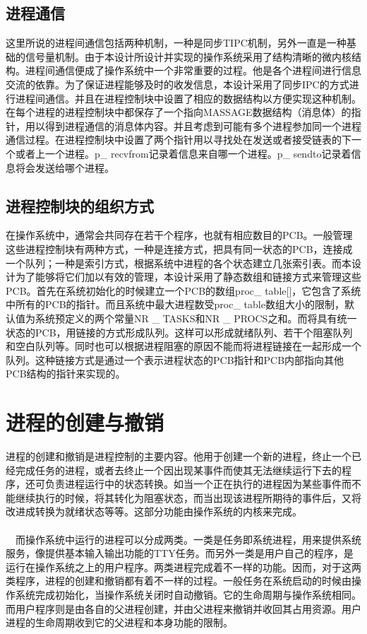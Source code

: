 \documentclass[UTF8,nofonts,cs4size]{ctexrep}
\begin{document}
\subsection{进程通信}
这里所说的进程间通信包括两种机制，一种是同步TIPC机制，另外一直是一种基础的信号量机制。由于本设计所设计并实现的操作系统采用了结构清晰的微内核结构。进程间通信便成了操作系统中一个非常重要的过程。他是各个进程间进行信息交流的依靠。为了保证进程能够及时的收发信息，本设计采用了同步IPC的方式进行进程间通信。并且在进程控制块中设置了相应的数据结构以方便实现这种机制。在每个进程的进程控制块中都保存了一个指向MASSAGE数据结构（消息体）的指针，用以得到进程通信的消息体内容。并且考虑到可能有多个进程参加同一个进程通信过程。在进程控制块中设置了两个指针用以寻找处在发送或者接受链表的下一个或者上一个进程。p\_ recvfrom记录着信息来自哪一个进程。p\_ sendto记录着信息将会发送给哪个进程。
\subsection{进程控制块的组织方式}
在操作系统中，通常会共同存在若干个程序，也就有相应数目的PCB。一般管理这些进程控制块有两种方式，一种是连接方式，把具有同一状态的PCB，连接成一个队列；一种是索引方式，根据系统中进程的各个状态建立几张索引表。而本设计为了能够将它们加以有效的管理，本设计采用了静态数组和链接方式来管理这些PCB。首先在系统初始化的时候建立一个PCB的数组proc\_ table[]，它包含了系统中所有的PCB的指针。而且系统中最大进程数受proc\_ table数组大小的限制，默认值为系统预定义的两个常量NR \_ TASKS和NR \_  PROCS之和。而将具有统一状态的PCB，用链接的方式形成队列。这样可以形成就绪队列、若干个阻塞队列和空白队列等。同时也可以根据进程阻塞的原因不能而将进程链接在一起形成一个队列。这种链接方式是通过一个表示进程状态的PCB指针和PCB内部指向其他PCB结构的指针来实现的。
\section{进程的创建与撤销}
进程的创建和撤销是进程控制的主要内容。他用于创建一个新的进程，终止一个已经完成任务的进程，或者去终止一个因出现某事件而使其无法继续运行下去的程序，还可负责进程运行中的状态转换。如当一个正在执行的进程因为某些事件而不能继续执行的时候，将其转化为阻塞状态，而当出现该进程所期待的事件后，又将改进成转换为就绪状态等等。这部分功能由操作系统的内核来完成。
\paragraph{}
\indent \ \ 而操作系统中运行的进程可以分成两类。一类是任务即系统进程，用来提供系统服务，像提供基本输入输出功能的TTY任务。而另外一类是用户自己的程序，是运行在操作系统之上的用户程序。两类进程完成着不一样的功能。因而，对于这两类程序，进程的创建和撤销都有着不一样的过程。一般任务在系统启动的时候由操作系统完成初始化，当操作系统关闭时自动撤销。它的生命周期与操作系统相同。而用户程序则是由各自的父进程创建，并由父进程来撤销并收回其占用资源。用户进程的生命周期收到它的父进程和本身功能的限制。
\end{document}
